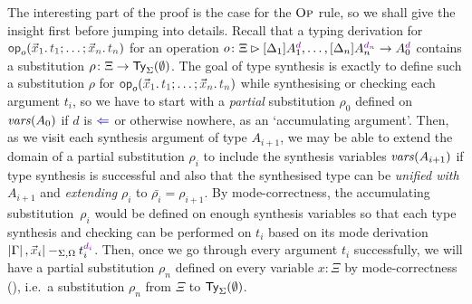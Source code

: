 The interesting part of the proof is the case for the $\textnormal{\textsc{Op}}$ rule, so we shall give the insight first before jumping into details.
Recall that a typing derivation for $\tmOpts$ for an operation $o\colon \Xi \rhd [\Delta_{1}] A_{1}^{\dir{d}}, \ldots, [\Delta_n]A_{n}^{\dir{d_n}} \to A_0^{\dir{d}}$ contains a substitution $\rho\colon \Xi \to \mathsf{Ty}_{\Sigma}(\emptyset)$.
The goal of type synthesis is exactly to define such a substitution $\rho$ for $\tmOpts$ while synthesising or checking each argument $t_i$, so we have to start with a \emph{partial} substitution $\rho_0$ defined on $\mathit{vars}(A_0)$ if $d$ is $\chk$ or otherwise nowhere, as an `accumulating argument'.
Then, as we visit each synthesis argument of type $A_{i+1}$, we may be able to extend the domain of a partial substitution $\rho_i$ to include the synthesis variables $\mathit{vars}(A_{i + 1})$ if type synthesis is successful and also that the synthesised type can be \emph{unified with $A_{i+ 1}$} and \emph{extending} $\rho_i$ to $\bar{\rho_i} = \rho_{i+1}$.
By mode-correctness, the accumulating substitution~$\rho_i$ would be defined on enough synthesis variables so that each type synthesis and checking can be performed on $t_i$ based on its mode derivation $\erase{\Gamma}, \vars{x}_i |-_{\Sigma, \Omega} t_i^{\dir{d_i}}$.
Then, once we go through every argument $t_i$ successfully, we will have a partial substitution $\rho_n$ defined on every variable $x : \Xi$ by mode-correctness (), i.e.\ a substitution $\rho_n$ from $\Xi$ to $\mathsf{Ty}_{\Sigma}(\emptyset)$.

